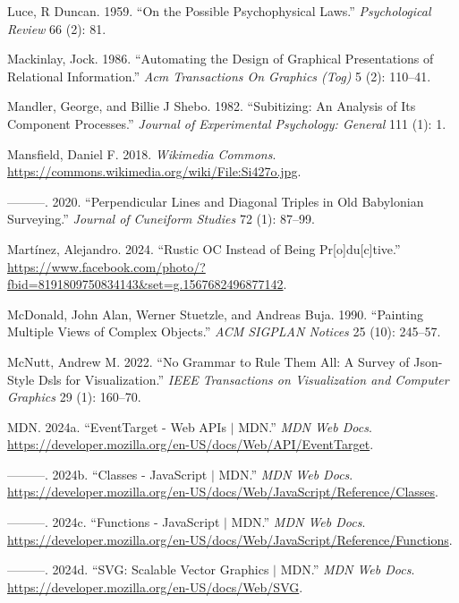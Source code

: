\documentclass[
  openany]{book}
\newlength{\cslhangindent}
\newenvironment{CSLReferences}[2] %
 {\begin{list}{}{%
  \setlength{\itemindent}{0pt}
  \setlength{\leftmargin}{0pt}
  \setlength{\parsep}{0pt}
  \ifodd #1
   \setlength{\leftmargin}{\cslhangindent}
   \setlength{\itemindent}{-1\cslhangindent}
  \fi
  \setlength{\itemsep}{#2\baselineskip}}}
 {\end{list}}
\theoremstyle{definition}
\theoremstyle{definition}
\theoremstyle{definition}
\theoremstyle{definition}
\theoremstyle{remark}
\begin{document}
\begin{CSLReferences}{1}{0}
Luce, R Duncan. 1959. {``On the Possible Psychophysical Laws.''} \emph{Psychological Review} 66 (2): 81.

Mackinlay, Jock. 1986. {``Automating the Design of Graphical Presentations of Relational Information.''} \emph{Acm Transactions On Graphics (Tog)} 5 (2): 110--41.

Mandler, George, and Billie J Shebo. 1982. {``Subitizing: An Analysis of Its Component Processes.''} \emph{Journal of Experimental Psychology: General} 111 (1): 1.

Mansfield, Daniel F. 2018. \emph{Wikimedia Commons}. \url{https://commons.wikimedia.org/wiki/File:Si427o.jpg}.

---------. 2020. {``Perpendicular Lines and Diagonal Triples in Old Babylonian Surveying.''} \emph{Journal of Cuneiform Studies} 72 (1): 87--99.

Martínez, Alejandro. 2024. {``Rustic OC Instead of Being Pr{[}o{]}du{[}c{]}tive.''} \url{https://www.facebook.com/photo/?fbid=8191809750834143&set=g.1567682496877142}.

McDonald, John Alan, Werner Stuetzle, and Andreas Buja. 1990. {``Painting Multiple Views of Complex Objects.''} \emph{ACM SIGPLAN Notices} 25 (10): 245--57.

McNutt, Andrew M. 2022. {``No Grammar to Rule Them All: A Survey of Json-Style Dsls for Visualization.''} \emph{IEEE Transactions on Visualization and Computer Graphics} 29 (1): 160--70.

MDN. 2024a. {``EventTarget - Web APIs {\(\vert\)} MDN.''} \emph{MDN Web Docs}. \url{https://developer.mozilla.org/en-US/docs/Web/API/EventTarget}.

---------. 2024b. {``Classes - JavaScript {\(\vert\)} MDN.''} \emph{MDN Web Docs}. \url{https://developer.mozilla.org/en-US/docs/Web/JavaScript/Reference/Classes}.

---------. 2024c. {``Functions - JavaScript {\(\vert\)} MDN.''} \emph{MDN Web Docs}. \url{https://developer.mozilla.org/en-US/docs/Web/JavaScript/Reference/Functions}.

---------. 2024d. {``SVG: Scalable Vector Graphics {\(\vert\)} MDN.''} \emph{MDN Web Docs}. \url{https://developer.mozilla.org/en-US/docs/Web/SVG}.


\end{CSLReferences}
\end{document}
